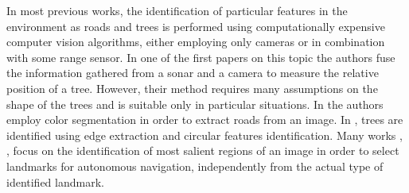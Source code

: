 \documentclass[letterpaper, 10pt, conference]{ieeeconf}      %
\begin{document}
In most previous works, the identification of particular features in the environment as roads and trees is performed using computationally expensive computer vision algorithms, either employing only cameras or in combination with some range sensor.
In one of the first papers on this topic \cite{94_MaOhYu} the authors fuse the information gathered from a sonar and a camera to measure the relative position of a tree.
However, their method requires many assumptions on the shape of the trees and is suitable only in particular situations.
In \cite{2003_CeDeMH} the authors employ color segmentation in order to extract roads from an image.
In \cite{2008_ZhXiXi}, trees are identified using edge extraction and circular features identification.
Many works \cite{Murrieta-cid02visualnavigation}, 
\cite{2004_ToTo}, \cite{2007_CeAlJi}
 focus on the identification of most salient regions of an image in order to select landmarks for autonomous navigation, independently from the actual type of identified landmark.
%
%
%
%
\end{document}
